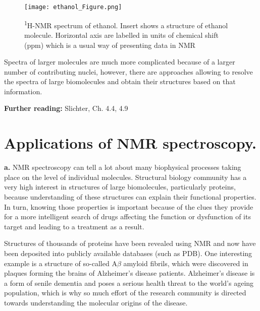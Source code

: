 \documentclass[a4paper, 12pt]{article}
\begin{document}
\begin{figure}[h]
\caption{\textsuperscript{1}H-NMR spectrum of ethanol. Insert shows a structure of ethanol molecule. Horizontal axis are labelled in units of chemical shift (ppm) which is a usual way of presenting data in NMR}
\label{fig:ethanol}
\centering
\texttt{[image: ethanol\_Figure.png]}
\end{figure}

  Spectra of larger molecules are much more complicated because of a larger number of contributing nuclei, however, there are approaches allowing to  resolve the spectra of large biomolecules and obtain their structures based on that information.
  
\textbf{Further reading:} Slichter, Ch. 4.4, 4.9 

\section{Applications of NMR spectroscopy.}

 \textbf{a.} NMR spectroscopy can tell a lot about many biophysical processes taking place on the level of individual molecules. Structural biology community has a very high interest in structures of large biomolecules, particularly proteins, because understanding of these structures can explain their functional properties. In turn, knowing those properties is important because of the clues they provide  for a more intelligent search of drugs affecting the function or dysfunction of its target and leading to a treatment as a result.

Structures of thousands of proteins have been revealed using NMR and now have been deposited into publicly available databases (such as PDB). One interesting example is a structure of so-called A$\beta$ amyloid fibrils, which were discovered in plaques forming the brains of Alzheimer's disease patients. Alzheimer's disease is a form of senile dementia and poses a serious health threat to the world's ageing population, which is why so much effort of the research community is directed towards understanding the molecular origins of the disease. 
\end{document}

